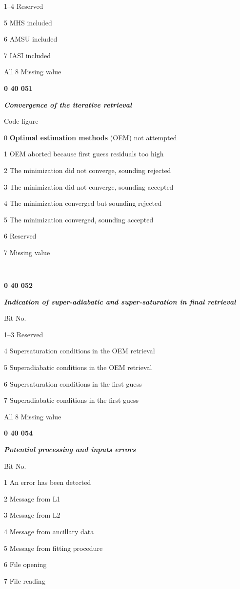 1--4 Reserved

5 MHS included

6 AMSU included

7 IASI included

All 8 Missing value

\textbf{0 40 051}

\emph{\textbf{Convergence of the iterative retrieval}}

Code figure

0 \textbf{Optimal estimation methods} (OEM) not attempted

1 OEM aborted because first guess residuals too high

2 The minimization did not converge, sounding rejected

3 The minimization did not converge, sounding accepted

4 The minimization converged but sounding rejected

5 The minimization converged, sounding accepted

6 Reserved

7 Missing value

\textbf{\\
}

\textbf{0 40 052}

\emph{\textbf{Indication of super-adiabatic and super-saturation in final retrieval}}

Bit No.

1--3 Reserved

4 Supersaturation conditions in the OEM retrieval

5 Superadiabatic conditions in the OEM retrieval

6 Supersaturation conditions in the first guess

7 Superadiabatic conditions in the first guess

All 8 Missing value

\textbf{0 40 054}

\emph{\textbf{Potential processing and inputs errors}}

Bit No.

1 An error has been detected

2 Message from L1

3 Message from L2

4 Message from ancillary data

5 Message from fitting procedure

6 File opening

7 File reading

